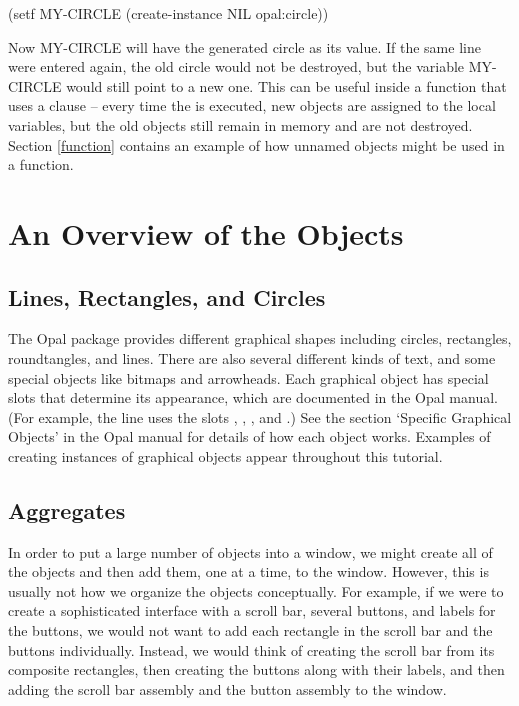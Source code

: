 \begin{programexample}
(setf MY-CIRCLE (create-instance NIL opal:circle))
\end{programexample}

Now MY-CIRCLE will have the generated circle as its value.  If the
same line were entered again, the old circle would not be destroyed,
but the variable MY-CIRCLE would still point to a new one.  This can
be useful inside a function that uses a  clause -- every time
the  is executed, new objects are assigned to the local
variables, but the old objects still remain in memory and are not
destroyed. Section \ref{function} contains an example of how unnamed
objects might be used in a function.


\chapter{An Overview of the Objects}

\section{Lines, Rectangles, and Circles}

The Opal package provides different graphical shapes
including circles, rectangles, roundtangles, and lines.  There are
also several different kinds of text, and some special objects like
bitmaps and arrowheads.  Each graphical object has special slots that
determine its appearance, which are documented in the Opal manual.
(For example, the line uses the slots , , ,
and .)
See the section  `Specific Graphical Objects' in the Opal manual for
details of how each object works.  Examples of creating instances of
graphical objects appear throughout this tutorial.


\section{Aggregates}
\label{aggregates}

In order to put a large number of objects into a window, we might
create all of the objects and then add them, one at a time, to the
window.  However, this is usually not how
we organize the objects conceptually.  For example, if we were to
create a sophisticated interface with a scroll bar, several buttons,
and labels for the buttons, we would not want to add each rectangle in
the scroll bar and the buttons individually.  Instead, we would think
of creating the scroll bar from its composite rectangles, then
creating the buttons along with their labels, and then adding the
scroll bar assembly and the button assembly to the window.

